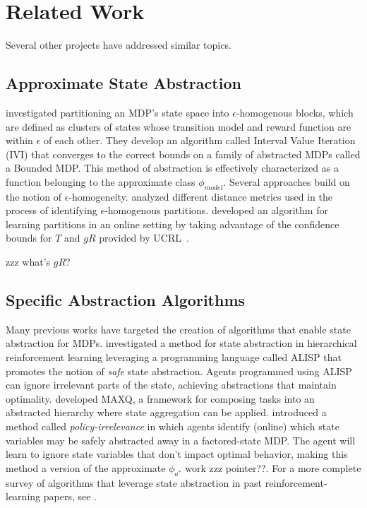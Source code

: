 \section{Related Work}

Several other projects have addressed similar topics.

\subsection{Approximate State Abstraction}
\citep*{dean1997model} investigated partitioning an \ac{MDP}'s state space into $\epsilon$-homogenous blocks, which are defined as clusters of states whose transition model and reward function are within $\epsilon$ of each other. They develop an algorithm called Interval Value Iteration (IVI) that converges to the correct bounds on a family of abstracted MDPs called a Bounded MDP. This method of abstraction is effectively characterized as a function belonging to the approximate class $\phi_{model}$.
Several approaches build on the notion of $\epsilon$-homogeneity. \citep*{even2003approximate} analyzed different distance metrics used in the process of identifying $\epsilon$-homogenous partitions. \citep*{ortner2013adaptive} developed an algorithm for learning partitions in an online setting by taking advantage of the confidence bounds for $T$ and $gR$ provided by UCRL~\cite{auer2009near}.

zzz what's $gR$?

\subsection{Specific Abstraction Algorithms}
Many previous works have targeted the creation of algorithms that enable state abstraction for MDPs. \citep*{andre2002state} investigated a method for state abstraction in hierarchical reinforcement learning leveraging a programming language called ALISP that promotes the notion of {\it safe} state abstraction. Agents programmed using ALISP can ignore irrelevant parts of the state, achieving abstractions that maintain optimality. \citep{dietterich2000hierarchical} developed MAXQ, a framework for composing tasks into an abstracted hierarchy where state aggregation can be applied. \citep*{jong2005state} introduced a method called {\it policy-irrelevance} in which agents identify (online) which state variables may be safely abstracted away in a factored-state \ac{MDP}. The agent will learn to ignore state variables that don't impact optimal behavior, making this method a version of the approximate $\phi_{a^*}$ work zzz pointer??. For a more complete survey of algorithms that leverage state abstraction in past reinforcement-learning papers, see \citep{li2006towards}.


